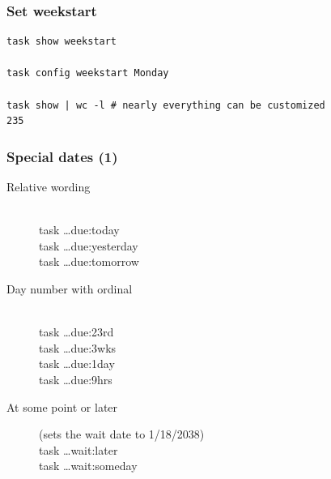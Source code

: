 \documentclass[t]{beamer}
\begin{document}
\begin{frame}[fragile]\frametitle{Set weekstart}
    \vfill
    \begin{lstlisting}
task show weekstart

task config weekstart Monday

task show | wc -l # nearly everything can be customized
235\end{lstlisting}
\end{frame}

\begin{frame}[fragile]\frametitle{Special dates (1)}
    \begin{description}
    \item[Relative wording] \hfill \\
        task \ldots due:today \\
        task \ldots due:yesterday \\
        task \ldots due:tomorrow \\
    \item[Day number with ordinal] \hfill \\
        task \ldots due:23rd \\
        task \ldots due:3wks \\
        task \ldots due:1day \\
        task \ldots due:9hrs \\
    \item[At some point or later] (sets the wait date to 1/18/2038) \hfill \\
        task \ldots wait:later \\
        task \ldots wait:someday
    \end{description}
\end{frame}
\end{document}
